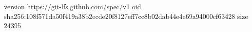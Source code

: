 version https://git-lfs.github.com/spec/v1
oid sha256:108f571da50f419a38b2ecde20f8127eff7cc8b02dab44e4e69a94000cf63428
size 24395
